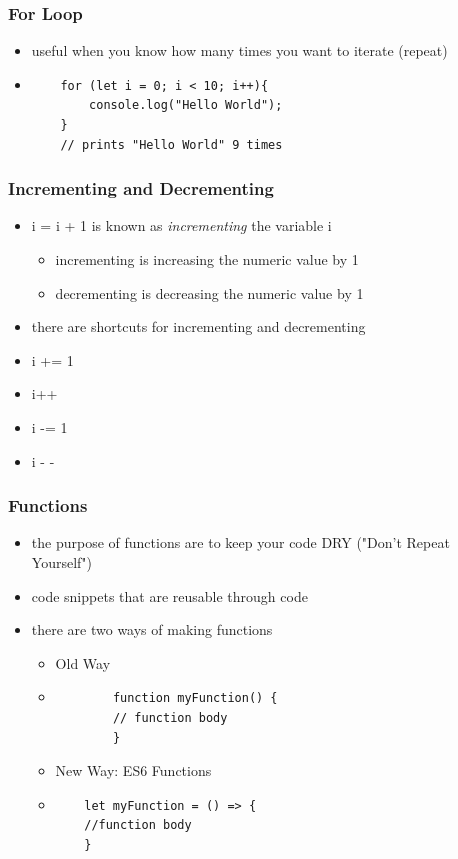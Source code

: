 \documentclass{beamer}
\begin{document}
\begin{frame}[fragile]
\frametitle{For Loop}
\begin{itemize}
	\item useful when you know how many times you want to iterate (repeat)
	\item \begin{lstlisting}
	for (let i = 0; i < 10; i++){
		console.log("Hello World");
	}
	// prints "Hello World" 9 times
	\end{lstlisting}
\end{itemize}
\end{frame}


\begin{frame}
\frametitle{Incrementing and Decrementing}
\begin{itemize}
	\item i = i + 1 is known as \emph{incrementing} the variable i
		\begin{itemize}
			\item incrementing is increasing the numeric value by 1
			\item decrementing is decreasing the numeric value by 1
		\end{itemize}
	\item there are shortcuts for incrementing and decrementing
	\item i += 1
	\item i++
	\item i -= 1
	\item i - -
\end{itemize}
\end{frame}

\begin{frame}[fragile]
\frametitle{Functions}
\begin{itemize}
	\item the purpose of functions are to keep your code DRY ("Don't Repeat Yourself")
	\item code snippets that are reusable through code
	\item there are two ways of making functions
	\begin{itemize}
		\item Old Way
		\item \begin{lstlisting}
		function myFunction() {
		// function body
		}
		\end{lstlisting}
	\item New Way: ES6 Functions
	\item \begin{lstlisting}
	let myFunction = () => {
	//function body
	}
	\end{lstlisting}
	\end{itemize}
\end{itemize}
\end{frame}
\end{document}

